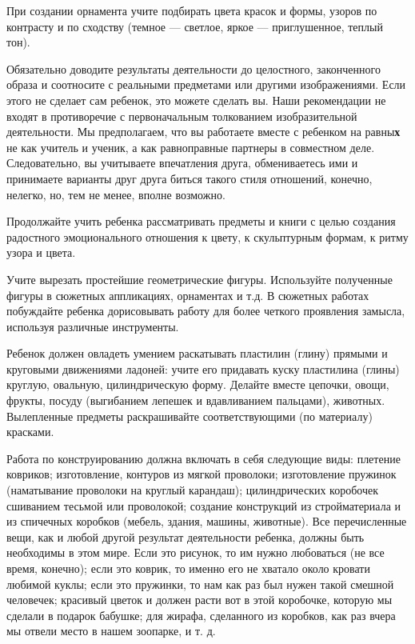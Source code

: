 \documentclass[a5paper]{book}
\begin{document}
При создании орнамента учите подбирать цвета красок и формы, узоров по
контрасту и по сходству (темное --- светлое, яркое --- приглушенное,
теплый тон).

Обязательно доводите результаты деятельности до целостного, законченного
образа и соотносите с реальными предметами или другими изображениями.
Если этого не сделает сам ребенок, это можете сделать вы. Наши
рекомендации не входят в противоречие с первоначальным толкованием
изобразительной деятельности. Мы предполагаем, что вы работаете вместе с
ребенком на равны\textbf{х} не как учитель и ученик, а как равноправные
партнеры в совместном деле. Следовательно, вы учитываете впечатления
друга, обмениваетесь ими и принимаете варианты друг друга биться такого
стиля отношений, конечно, нелегко, но, тем не менее, вполне возможно.

Продолжайте учить ребенка рассматривать предметы и книги с целью
создания радостного эмоционального отношения к цвету, к скульптурным
формам, к ритму узора и цвета.

Учите вырезать простейшие геометрические фигуры. Используйте полученные
фигуры в сюжетных аппликациях, орнаментах и т.д. В сюжетных работах
побуждайте ребенка дорисовывать работу для более четкого проявления
замысла, используя различные инструменты.

Ребенок должен овладеть умением раскатывать пластилин (глину) прямыми и
круговыми движениями ладоней: учите его придавать куску пластилина
(глины) круглую, овальную, цилиндрическую форму. Делайте вместе цепочки,
овощи, фрукты, посуду (выгибанием лепешек и вдавливанием пальцами),
животных. Вылепленные предметы раскрашивайте соответствующими (по
материалу) красками.

Работа по конструированию должна включать в себя следующие виды:
плетение ковриков; изготовление, контуров из мягкой проволоки;
изготовление пружинок (наматывание проволоки на круглый карандаш);
цилиндрических коробочек сшиванием тесьмой или проволокой; создание
конструкций из стройматериала и из спичечных коробков (мебель, здания,
машины, животные). Все перечисленные вещи, как и любой другой результат
деятельности ребенка, должны быть необходимы в этом мире. Если это
рисунок, то им нужно любоваться (не все время, конечно); если это
коврик, то именно его не хватало около кровати любимой куклы; если это
пружинки, то нам как раз был нужен такой смешной человечек; красивый
цветок и должен расти вот в этой коробочке, которую мы сделали в подарок
бабушке; для жирафа, сделанного из коробков, как раз вчера мы отвели
место в нашем зоопарке, и т. д.
\end{document}
